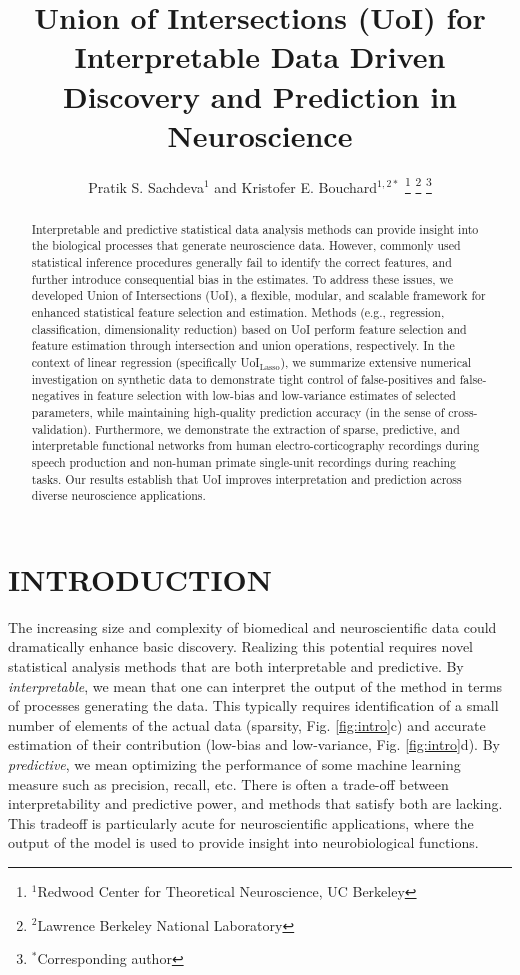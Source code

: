 \documentclass[letterpaper, 10 pt, conference]{ieeeconf}  %
\title{\LARGE \bf
Union of Intersections (UoI) for Interpretable Data Driven Discovery and Prediction in Neuroscience
}
\author{
    Pratik S. Sachdeva$^{1}$ and Kristofer E. Bouchard$^{1,2*}$%
    \thanks{
        $^{1}$Redwood Center for Theoretical Neuroscience, UC Berkeley
    }%
    \thanks{
        $^{2}$Lawrence Berkeley National Laboratory
    }%
    \thanks{
        $^*$Corresponding author
    }%
}
\begin{document}
\maketitle
\thispagestyle{empty}
\pagestyle{empty}


\begin{abstract}

Interpretable and predictive statistical data analysis methods can provide insight into the biological processes that generate neuroscience data.  However, commonly used statistical inference procedures generally fail to identify the correct features, and further introduce consequential bias in the estimates. To address these issues, we developed Union of Intersections (UoI), a flexible, modular, and scalable framework for enhanced statistical feature selection and estimation. Methods (e.g., regression, classification, dimensionality reduction) based on UoI perform feature selection and feature estimation through intersection and union operations, respectively. In the context of linear regression (specifically UoI$_{\text{Lasso}}$), we summarize extensive numerical investigation on synthetic data to demonstrate tight control of false-positives and false-negatives in feature selection with low-bias and low-variance estimates of selected parameters, while maintaining high-quality prediction accuracy (in the sense of cross-validation). Furthermore, we demonstrate the extraction of sparse, predictive, and interpretable functional networks from human electro-corticography recordings during speech production and non-human primate single-unit recordings during reaching tasks. Our results establish that UoI improves interpretation and prediction across diverse neuroscience applications. 

\end{abstract}


\section{INTRODUCTION}
The increasing size and complexity of biomedical and neuroscientific data could dramatically enhance basic discovery. Realizing this potential requires novel statistical analysis methods that are both interpretable and predictive. By \textit{interpretable}, we mean that one can interpret the output of the method in terms of processes generating the data. This typically requires identification of a small number of elements of the actual data (sparsity, Fig. \ref{fig:intro}c) and accurate estimation of their contribution (low-bias and low-variance, Fig. \ref{fig:intro}d). By \textit{predictive}, we mean optimizing the performance of some machine learning measure such as precision, recall, etc. There is often a trade-off between interpretability and predictive power, and methods that satisfy both are lacking. This tradeoff is particularly acute for neuroscientific applications, where the output of the model is used to provide insight into neurobiological functions. 
\end{document}
